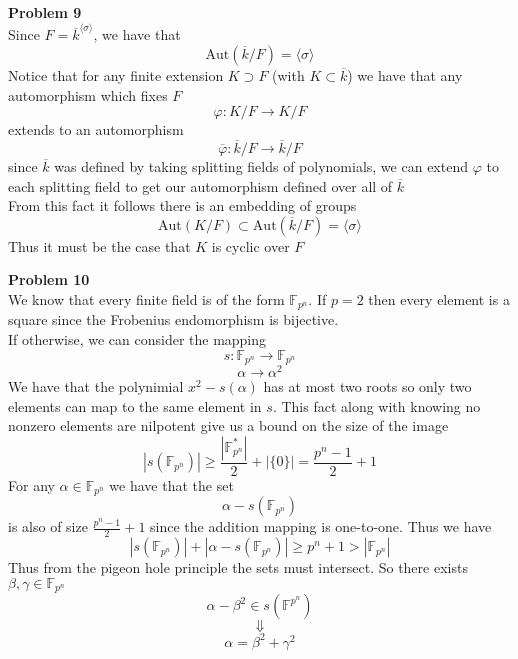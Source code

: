 \documentclass[12pt]{article}
\newenvironment{ques}[1]{\textbf{Problem #1}\vspace{1 mm}\\ }{\bigskip}
\theoremstyle{definition}
\renewcommand{\l}{\left }
\renewcommand{\r}{\right }
\newcommand{\F}{\mathbb F}
\renewcommand{\a}{\alpha}
\renewcommand{\b}{\beta}
\newcommand{\Aut}{\text{Aut}}
\begin{document}
\begin{ques}{9}
	Since $F = \overline k ^{\langle \sigma \rangle}$, we have that 
	$$\Aut(\overline k / F) = \langle \sigma \rangle$$
	Notice that for any finite extension $K \supset F$ (with $K \subset
	\overline k$) we have that any automorphism which fixes $F$
	$$\varphi:K/F \to K/F$$
	extends to an automorphism 
	$$\overline\varphi:\overline k/F \to \overline k/F$$
	since $\overline k$ was defined by taking splitting fields of polynomials,
	we can extend $\varphi$ to each splitting field to get our automorphism defined over
	all of $\overline k$\\
	From this fact it follows there is an embedding of groups
	$$\Aut(K/F) \subset \Aut(\overline k/F) = \langle \sigma \rangle$$
	Thus it must be the case that $K$ is cyclic over $F$
\end{ques}

\begin{ques}{10}
	We know that every finite field is of the form $\F_{p^n}$. If $p = 2$ then
	every element is a square since the Frobenius endomorphism is bijective.\\
	If otherwise, we can consider the mapping
	$$s: \F_{p^n} \to \F_{p^n}$$
	$$\a \to \a^2$$
	We have that the polynimial $x^2 - s(\a)$ has at most two roots so only two
	elements can map to the same element in $s$. This fact along with knowing
	no nonzero elements are nilpotent give us a bound on the size of the image
	$$|s\l(\F_{p^n}\r)| \geq \frac{|\F^*_{p^n}|}{2} + |\{0\}| = \frac{p^n-1}{2}
	+ 1$$
	For any $\a \in \F_{p^n}$ we have that the set 
	$$\a - s(\F_{p^n})$$
	is also of size $\frac{p^n-1}{2} + 1$ since the addition mapping is
	one-to-one. Thus we have
	$$|s\l(\F_{p^n}\r)| + |\a - s(\F_{p^n})| \geq p^n + 1 > |\F_{p^n}|$$
	Thus from the pigeon hole principle the sets must intersect. So there
	exists $\b, \gamma \in \F_{p^n}$
	$$\a - \beta^2 \in s(\F^{p^n})$$
	$$\Downarrow$$
	$$\a = \beta^2 + \gamma^2$$
\end{ques}
\end{document}
